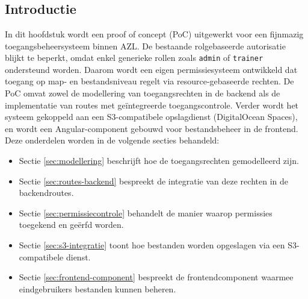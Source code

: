 \chapter{}
\label{ch:proof-of-concept}
\section{Introductie}
In dit hoofdstuk wordt een proof of concept (PoC) uitgewerkt voor een fijnmazig toegangsbeheersysteem binnen AZL. De bestaande rolgebaseerde autorisatie blijkt te beperkt, omdat enkel generieke rollen zoals \texttt{admin} of \texttt{trainer} ondersteund worden. Daarom wordt een eigen permissiesysteem ontwikkeld dat toegang op map- en bestandsniveau regelt via resource-gebaseerde rechten.
De PoC omvat zowel de modellering van toegangsrechten in de backend als de implementatie van routes met geïntegreerde toegangscontrole. Verder wordt het systeem gekoppeld aan een S3-compatibele opslagdienst (DigitalOcean Spaces), en wordt een Angular-component gebouwd voor bestandsbeheer in de frontend.
Deze onderdelen worden in de volgende secties behandeld:
\begin{itemize}
\item Sectie \ref{sec:modellering} beschrijft hoe de toegangsrechten gemodelleerd zijn.
\item Sectie \ref{sec:routes-backend} bespreekt de integratie van deze rechten in de backendroutes.
\item Sectie \ref{sec:permissiecontrole} behandelt de manier waarop permissies toegekend en geërfd worden.
\item Sectie \ref{sec:s3-integratie} toont hoe bestanden worden opgeslagen via een S3-compatibele dienst.
\item Sectie \ref{sec:frontend-component} bespreekt de frontendcomponent waarmee eindgebruikers bestanden kunnen beheren.
\end{itemize}
